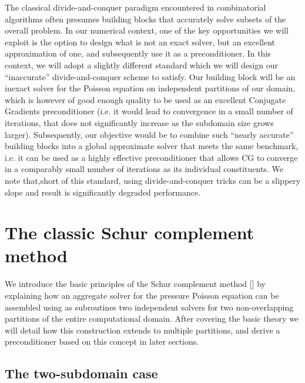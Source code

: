 The classical divide-and-conquer paradigm encountered in combinatorial algorithms often presumes building blocks that accurately solve subsets of the overall problem. In our numerical context, one of the key opportunities we will exploit is the option to design what is not an exact solver, but an excellent approximation of one, and subsequently use it as a preconditioner. In this context, we will adopt a slightly different standard which we will design our ``inaccurate'' divide-and-conquer scheme to satisfy. Our building block will be an inexact solver for the Poisson equation on independent partitions of our domain, which is however of good enough quality to be used as an excellent Conjugate Gradients preconditioner (i.e. it would lead to convergence in a small number of iterations, that does not significantly increase as the subdomain size grows larger). Subsequently, our objective would be to combine such ``nearly accurate'' building blocks into a global approximate solver that meets the same benchmark, i.e. it can be used as a highly effective preconditioner that allows CG to converge in a comparably small number of iterations as its individual constituents. We note that,short of this standard, using divide-and-conquer tricks can be a slippery slope and result is significantly degraded performance.

\section{The classic Schur complement method}
\label{sec:dd-fundamentals}

We introduce the basic principles of the Schur complement method [\cite{quarteroni:1999:domain}] by explaining how an aggregate solver for the pressure Poisson
equation can be assembled using as subroutines two independent solvers for two non-overlapping partitions of the entire computational domain.
After covering the basic theory we will detail how this construction extends to multiple partitions, and derive a preconditioner based on this concept in later sections.

\subsection{The two-subdomain case}

